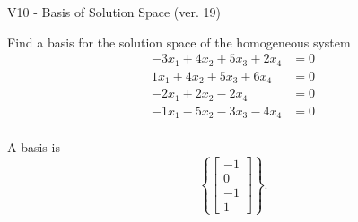 \begin{exercise}
  \begin{exerciseTitle}V10 - Basis of Solution Space (ver. 19)\end{exerciseTitle}
  \begin{exerciseStatement}
    Find a basis for the solution space of the homogeneous system 
\begin{align*}
 -3 x_ 1 + 4 x_ 2 + 5 x_ 3 + 2 x_ 4 &= 0  \\ 
  1 x_ 1 + 4 x_ 2 + 5 x_ 3 + 6 x_ 4 &= 0  \\ 
  -2 x_ 1 + 2 x_ 2 -2 x_ 4 &= 0  \\ 
  -1 x_ 1 -5 x_ 2 -3 x_ 3 -4 x_ 4 &= 0  \\ 
 \end{align*}


 
  \end{exerciseStatement}

  \begin{exerciseAnswer}
   A basis is   
\[\left\{\left[\begin{array}{c}
-1 \\
0 \\
-1 \\
1
\end{array}\right]\right\}.\]

  


  \end{exerciseAnswer}
\end{exercise}